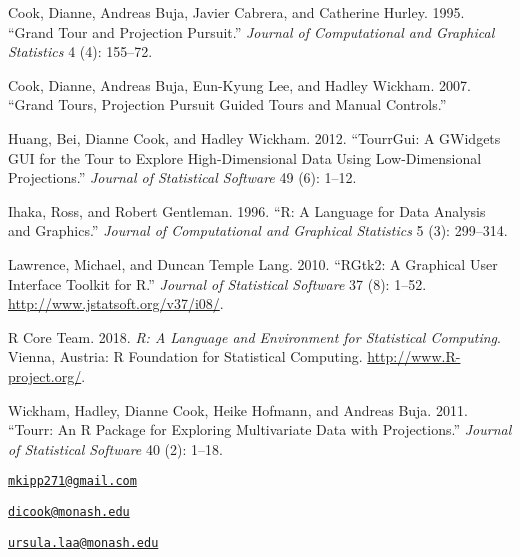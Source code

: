 Cook, Dianne, Andreas Buja, Javier Cabrera, and Catherine Hurley. 1995.
``Grand Tour and Projection Pursuit.'' \emph{Journal of Computational
and Graphical Statistics} 4 (4): 155--72.

Cook, Dianne, Andreas Buja, Eun-Kyung Lee, and Hadley Wickham. 2007.
``Grand Tours, Projection Pursuit Guided Tours and Manual Controls.''

Huang, Bei, Dianne Cook, and Hadley Wickham. 2012. ``TourrGui: A
GWidgets GUI for the Tour to Explore High-Dimensional Data Using
Low-Dimensional Projections.'' \emph{Journal of Statistical Software} 49
(6): 1--12.

Ihaka, Ross, and Robert Gentleman. 1996. ``R: A Language for Data
Analysis and Graphics.'' \emph{Journal of Computational and Graphical
Statistics} 5 (3): 299--314.

Lawrence, Michael, and Duncan {Temple Lang}. 2010. ``RGtk2: A Graphical
User Interface Toolkit for R.'' \emph{Journal of Statistical Software}
37 (8): 1--52. \url{http://www.jstatsoft.org/v37/i08/}.

R Core Team. 2018. \emph{R: A Language and Environment for Statistical
Computing}. Vienna, Austria: R Foundation for Statistical Computing.
\url{http://www.R-project.org/}.

Wickham, Hadley, Dianne Cook, Heike Hofmann, and Andreas Buja. 2011.
``Tourr: An R Package for Exploring Multivariate Data with
Projections.'' \emph{Journal of Statistical Software} 40 (2): 1--18.

\address{%
Michael Kipp\\
Monash University\\
Department of Econometrics and Business Statistics\\
}
\href{mailto:mkipp271@gmail.com}{\nolinkurl{mkipp271@gmail.com}}

\address{%
Dianne Cook\\
Monash University\\
Department of Econometrics and Business Statistics\\
}
\href{mailto:dicook@monash.edu}{\nolinkurl{dicook@monash.edu}}

\address{%
Ursula Laa\\
Monash University\\
Department of Physics\\
}
\href{mailto:ursula.laa@monash.edu}{\nolinkurl{ursula.laa@monash.edu}}

